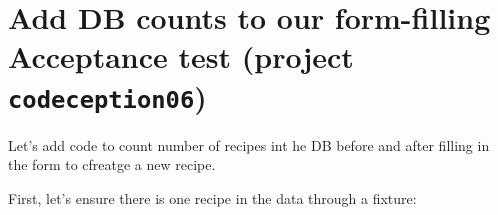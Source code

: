 \documentclass[a4paperpaper,openright]{book}
\newenvironment{Shaded}{}{}
\newcommand{\DecValTok}[1]{\textcolor[rgb]{0.25,0.63,0.44}{#1}}
\newcommand{\FunctionTok}[1]{\textcolor[rgb]{0.02,0.16,0.49}{#1}}
\newcommand{\KeywordTok}[1]{\textcolor[rgb]{0.00,0.44,0.13}{\textbf{#1}}}
\newcommand{\NormalTok}[1]{#1}
\newcommand{\OtherTok}[1]{\textcolor[rgb]{0.00,0.44,0.13}{#1}}
\newcommand{\StringTok}[1]{\textcolor[rgb]{0.25,0.44,0.63}{#1}}
\begin{document}
\hypertarget{add-db-counts-to-our-form-filling-acceptance-test-project-codeception06}{%
\section{\texorpdfstring{Add DB counts to our form-filling Acceptance
test (project
\texttt{codeception06})}{Add DB counts to our form-filling Acceptance test (project codeception06)}}\label{add-db-counts-to-our-form-filling-acceptance-test-project-codeception06}}

Let's add code to count number of recipes int he DB before and after
filling in the form to cfreatge a new recipe.

First, let's ensure there is one recipe in the data through a fixture:

\begin{Shaded}
\end{Shaded}
\end{document}

